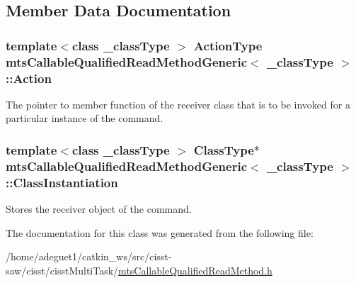 \subsection{Member Data Documentation}
\hypertarget{classmts_callable_qualified_read_method_generic_a39b88372b35325f8ed51a406e42b9c51}{
\subsubsection[{Action}]{\setlength{\rightskip}{0pt plus 5cm}template$<$class \-\_\-class\-Type $>$ {\bf Action\-Type} {\bf mts\-Callable\-Qualified\-Read\-Method\-Generic}$<$ \-\_\-class\-Type $>$\-::Action\hspace{0.3cm}{\ttfamily [protected]}}}\label{classmts_callable_qualified_read_method_generic_a39b88372b35325f8ed51a406e42b9c51}
The pointer to member function of the receiver class that is to be invoked for a particular instance of the command. \hypertarget{classmts_callable_qualified_read_method_generic_aa2cc99ad37b816f02a8287a26e3f22b0}{
\subsubsection[{Class\-Instantiation}]{\setlength{\rightskip}{0pt plus 5cm}template$<$class \-\_\-class\-Type $>$ {\bf Class\-Type}$\ast$ {\bf mts\-Callable\-Qualified\-Read\-Method\-Generic}$<$ \-\_\-class\-Type $>$\-::Class\-Instantiation\hspace{0.3cm}{\ttfamily [protected]}}}\label{classmts_callable_qualified_read_method_generic_aa2cc99ad37b816f02a8287a26e3f22b0}
Stores the receiver object of the command. 

The documentation for this class was generated from the following file\-:\begin{DoxyCompactItemize}
\item 
/home/adeguet1/catkin\-\_\-ws/src/cisst-\/saw/cisst/cisst\-Multi\-Task/\hyperlink{mts_callable_qualified_read_method_8h}{mts\-Callable\-Qualified\-Read\-Method.\-h}\end{DoxyCompactItemize}
